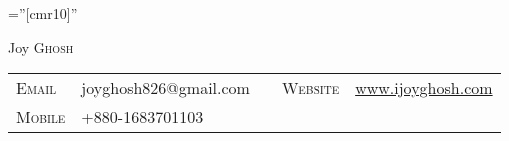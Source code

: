 \documentclass[a4paper,10pt]{article}
\begin{document}

\pagestyle{empty} %

\font\fb=''[cmr10]'' %

\par{\centering
    {\Huge Joy \textsc{Ghosh}
  }\bigskip\par}

\begin{comment}
\begin{tabular}{rl}
    \textsc{Mobile}     & +880-1683701103\\
\end{tabular}
\end{comment}

\begin{tabular}{p{1cm}p{4cm}p{1cm}p{1.2cm}p{3cm}}
     \textsc{Email} & joyghosh826@gmail.com
     & & 
     \textsc{Website} & \href{www.ijoyghosh.com}{www.ijoyghosh.com} \\
     \textsc{Mobile} & +880-1683701103 & & &
\end{tabular}

\end{document}
